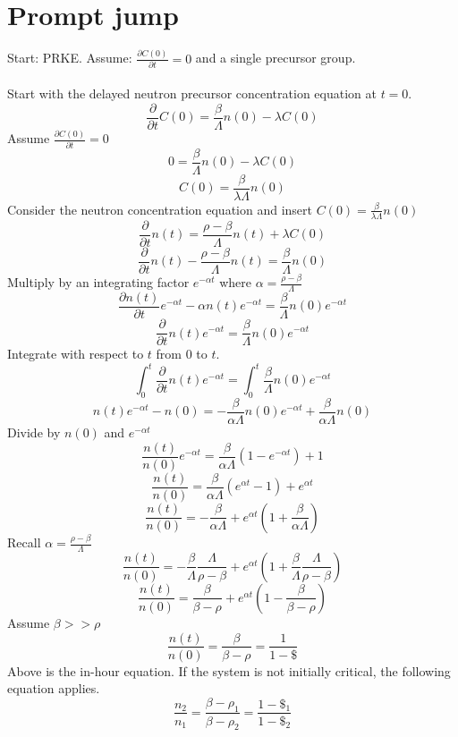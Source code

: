 \documentclass[]{article}
\begin{document}
		\section*{\textbf{Prompt jump}} Start: PRKE. Assume: $\frac{\partial C(0)}{\partial t}=0$ and a single precursor group.\\\\
		Start with the delayed neutron precursor concentration equation at $t=0$.
		\[
		\frac{\partial}{\partial t}C(0) =\frac{\beta}{\Lambda}n(0)-\lambda C(0) 
		\]
		Assume $\frac{\partial C(0)}{\partial t}=0$
		\[
		0 =\frac{\beta}{\Lambda}n(0)-\lambda C(0) 
		\]
		\[
		C(0) =\frac{\beta}{\lambda\Lambda}n(0)
		\]
		Consider the neutron concentration equation and insert $C(0) =\frac{\beta}{\lambda\Lambda}n(0)$
		\[
		\frac{\partial}{\partial t}n(t)= \frac{\rho-\beta}{\Lambda}n(t)+\lambda C(0)
		\]
		\[
		\frac{\partial}{\partial t}n(t)- \frac{\rho-\beta}{\Lambda}n(t)=\frac{\beta}{\Lambda}n(0)
		\]
		Multiply by an integrating factor $e^{-\alpha t}$ where $\alpha = \frac{\rho-\beta}{\Lambda}$
		\[
		\frac{\partial n(t)}{\partial t}e^{-\alpha t}-\alpha n(t)e^{-\alpha t}=\frac{\beta}{\Lambda}n(0)e^{-\alpha t}
		\]
		\[
		\frac{\partial}{\partial t}n(t)e^{-\alpha t}=\frac{\beta}{\Lambda}n(0)e^{-\alpha t}
		\]
		Integrate with respect to $t$ from 0 to $t$.
		\[
		\int_{0}^{t}\frac{\partial}{\partial t}n(t)e^{-\alpha t}=\int_{0}^{t}\frac{\beta}{\Lambda}n(0)e^{-\alpha t}
		\]
		\[
		n(t)e^{-\alpha t}-n(0)=-\frac{\beta}{\alpha\Lambda}n(0)e^{-\alpha t} + \frac{\beta}{\alpha\Lambda}n(0)
		\]
		Divide by $n(0)$ and $e^{-\alpha t}$
		\[
		\frac{n(t)}{n(0)}e^{-\alpha t}=\frac{\beta}{\alpha\Lambda}(1-e^{-\alpha t}) +1
		\]
		\[
		\frac{n(t)}{n(0)}=\frac{\beta}{\alpha\Lambda}(e^{\alpha t}-1) +e^{\alpha t}
		\]
		\[
		\frac{n(t)}{n(0)}=-\frac{\beta}{\alpha\Lambda}+e^{\alpha t}(1+\frac{\beta}{\alpha\Lambda})
		\]
		Recall $\alpha = \frac{\rho-\beta}{\Lambda}$
		\[
		\frac{n(t)}{n(0)}=-\frac{\beta}{\Lambda}\frac{\Lambda}{\rho-\beta}+e^{\alpha t}(1+\frac{\beta}{\Lambda}\frac{\Lambda}{\rho-\beta})
		\]
		\[
		\frac{n(t)}{n(0)}=\frac{\beta}{\beta-\rho}+e^{\alpha t}(1-\frac{\beta}{\beta-\rho})
		\]
		Assume $\beta>>\rho$
		\[
		\frac{n(t)}{n(0)}=\frac{\beta}{\beta-\rho} = \frac{1}{1-\$}
		\]
		Above is the in-hour equation. If the system is not initially critical, the following equation applies.
		\[
		\frac{n_2}{n_1}=\frac{\beta-\rho_1}{\beta-\rho_2} = \frac{1-\$_1}{1-\$_2}
		\]
			
\end{document}
